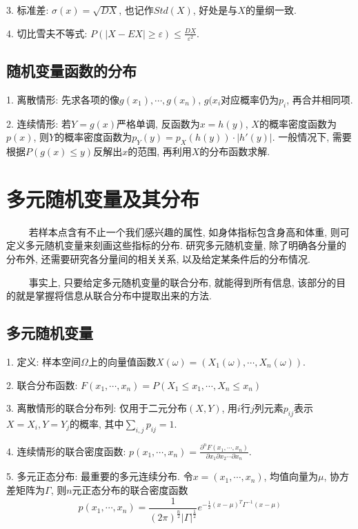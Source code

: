 3. 标准差: $\sigma(x)=\sqrt{DX}$, 也记作$Std(X)$, 好处是与$X$的量纲一致.

4. 切比雪夫不等式: $P(|X-EX|\geq \varepsilon)\leq \frac{DX}{\varepsilon^2}$.

\subsection{随机变量函数的分布}

1. 离散情形: 先求各项的像$g(x_1),\cdots, g(x_n)$, $g(x_i$对应概率仍为$p_i$, 再合并相同项.

2. 连续情形: 若$Y=g(x)$严格单调, 反函数为$x=h(y)$, $X$的概率密度函数为$p(x)$, 则$Y$的概率密度函数为$p_Y(y)=p_X(h(y)) \cdot |h'(y)|$.
一般情况下, 需要根据$P(g(x)\leq y)$反解出$x$的范围, 再利用$X$的分布函数求解.

\section{多元随机变量及其分布}

\begin{tcolorbox}[colback=red!5,colframe=red!75!black]
    ~~~~ 若样本点含有不止一个我们感兴趣的属性, 如身体指标包含身高和体重, 则可定义多元随机变量来刻画这些指标的分布. 研究多元随机变量, 除了明确各分量的分布外, 还需要研究各分量间的相关关系, 以及给定某条件后的分布情况. 
    
    ~~~~ 事实上, 只要给定多元随机变量的联合分布, 就能得到所有信息, 该部分的目的就是掌握将信息从联合分布中提取出来的方法.
\end{tcolorbox}

\subsection{多元随机变量}

1. 定义: 样本空间$\Omega$上的向量值函数$X(\omega)=(X_1(\omega),\cdots,X_n(\omega))$.

2. 联合分布函数: $F(x_1,\cdots, x_n)=P(X_1\leq x_1, \cdots, X_n \leq x_n)$

3. 离散情形的联合分布列: 仅用于二元分布$(X,Y)$, 用$i$行$j$列元素$p_{ij}$表示$X=X_i,Y=Y_j$的概率, 其中$\sum\limits_{i,j}p_{ij}=1$.

4. 连续情形的联合密度函数: $p(x_1,\cdots, x_n)=\frac{\partial^nF(x_1,\cdots,x_n)}{\partial x_1\partial x_2 \cdots \partial x_n}$.

5. 多元正态分布: 最重要的多元连续分布. 令$x=(x_1,\cdots,x_n)$, 均值向量为$\mu$, 协方差矩阵为$\Gamma$, 则$n$元正态分布的联合密度函数
\begin{equation*}
    p(x_1,\cdots,x_n)=\frac{1}{(2\pi)^\frac{n}{2}|\Gamma|^\frac{1}{2}}e^{-\frac{1}{2}(x-\mu)^T\Gamma^{-1}(x-\mu)}
\end{equation*}

